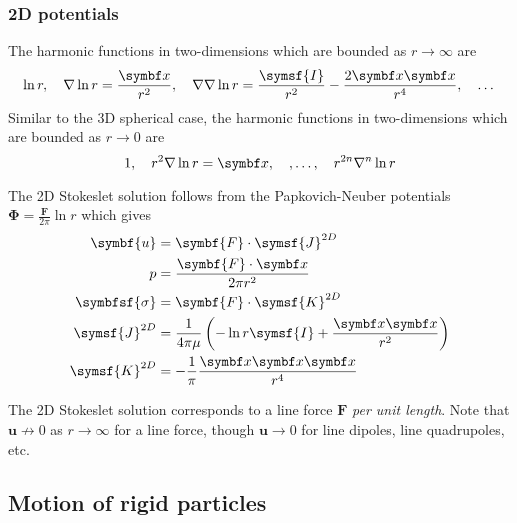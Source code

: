\documentclass{jknotes}
\begin{document}
\subsubsection{2D potentials}
The harmonic functions in two-dimensions which are bounded as $r \to \infty$
are
\begin{equation}
	\ln r, \hspace{1em} \nabla \ln r = \frac{\x}{r^2}, \hspace{1em} \nabla
	\nabla \ln r = \frac{\symsf{I}}{r^2} - \frac{2\x\x}{r^4}, \hspace{1em}\dots
\end{equation}
Similar to the 3D spherical case, the harmonic functions in two-dimensions
which are bounded as $r \to 0$ are
\begin{equation}
	1, \hspace{1em} r^2\nabla \ln r = \x, \hspace{1em}, \dots, \hspace{1em}
	r^{2n} \nabla^n \ln r
\end{equation}

The 2D Stokeslet solution follows from the Papkovich-Neuber potentials
$\symbf{\Phi} = \frac{\symbf{F}}{2\pi} \ln r$ which gives
\begin{align}
	\symbf{u} &= \symbf{F}\cdot\symsf{J}^{2D} \\
	p &= \frac{\symbf{F}\cdot\x}{2\pi r^2} \\
	\symbfsf{\sigma} &= \symbf{F} \cdot \symsf{K}^{2D} \\
	\symsf{J}^{2D} &= \frac{1}{4\pi \mu} \left( -\ln r \symsf{I} +
	\frac{\x\x}{r^2}\right) \\
	\symsf{K}^{2D} &= -\frac{1}{\pi} \frac{\x\x\x}{r^4}
\end{align}

The 2D Stokeslet solution corresponds to a line force $\symbf{F}$ \emph{per unit
length}. Note that $\symbf{u} \not\to 0$ as $r \to \infty$ for a line force,
though $\symbf{u} \to 0$ for line dipoles, line quadrupoles, etc.

\subsection{Motion of rigid particles}
\end{document}
